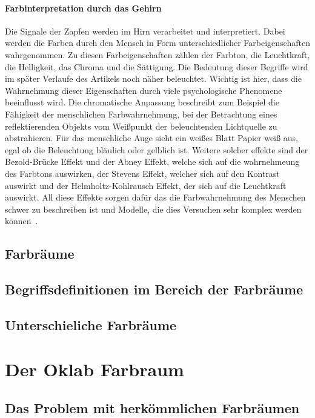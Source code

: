 \documentclass[12pt, a4paper, ngerman]{article}
\begin{document}
\paragraph{Farbinterpretation durch das Gehirn}
Die Signale der Zapfen werden im Hirn verarbeitet und interpretiert. 
Dabei werden die Farben durch den Mensch in Form unterschiedlicher Farbeigenschaften wahrgenommen.
Zu diesen Farbeigenschaften zählen der Farbton, die Leuchtkraft, die Helligkeit, das Chroma und die Sättigung.
Die Bedeutung dieser Begriffe wird im später Verlaufe des Artikels noch näher beleuchtet.
Wichtig ist hier, dass die Wahrnehmung dieser Eigenschaften durch viele psychologische Phenomene beeinflusst wird.
Die chromatische Anpassung beschreibt zum Beispiel die Fähigkeit der menschlichen Farbwahrnehmung, 
bei der Betrachtung eines reflektierenden Objekts vom Weißpunkt der beleuchtenden Lichtquelle zu abstrahieren. 
Für das menschliche Auge sieht ein weißes Blatt Papier weiß aus, egal ob die Beleuchtung bläulich oder gelblich ist.
Weitere solcher effekte sind der Bezold-Brücke Effekt und der Abney Effekt, welche sich auf die wahrnehmeung des Farbtons auswirken,
der Stevens Effekt, welcher sich auf den Kontrast auswirkt und der Helmholtz-Kohlrausch Effekt, der sich auf die Leuchtkraft auswirkt.
All diese Effekte sorgen dafür das die Farbwahrnehmung des Menschen schwer zu beschreiben ist und Modelle, die dies Versuchen sehr komplex werden können~\cite{Color_appearance_model_2023}.

\subsection{Farbräume}


\subsection{Begriffsdefinitionen im Bereich der Farbräume}
\subsection{Unterschieliche Farbräume}

\section{Der Oklab Farbraum}
\subsection{Das Problem mit herkömmlichen Farbräumen}
\end{document}
